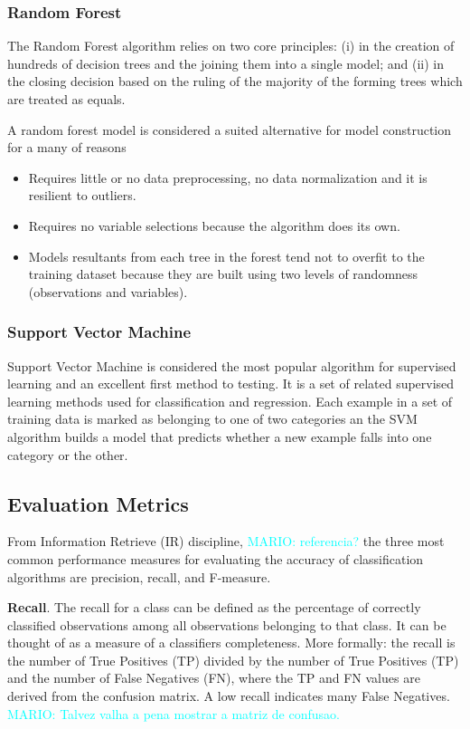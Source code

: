 \documentclass[10pt, conference]{IEEEtran}
\newcommand{\mario}[1]{\noindent\textcolor{cyan}{MARIO: {#1}}}
\newcommand{\mario}[1]{}
\begin{document}
\subsubsection{Random Forest}     \label{subsubsec:rf}
The Random Forest algorithm\cite{Breiman2001} relies on two core principles: (i) in the creation of hundreds of decision trees and the joining them into a single model; and (ii) in the closing decision based on the ruling of the majority of the forming trees which are treated as equals.

A random forest model is considered a suited alternative for model construction for a many of reasons\cite{Williams2011} 

\begin{itemize}
  \item Requires little or no data preprocessing, no data normalization and it is resilient to outliers.
  \item Requires no variable selections because the algorithm does its own.
  \item Models resultants from each tree in the forest tend not to overfit to the training dataset because they are built using two levels of randomness (observations and variables).
\end{itemize}

\subsubsection{Support Vector Machine}		\label{subsubsec:svm}
Support Vector Machine is considered the most popular algorithm for supervised learning and an excellent first method to testing\cite{Russell2010}. It is a set of related supervised learning methods used for classification and regression. Each example in a set of training data is marked as belonging to one of two categories an the SVM algorithm builds a model that predicts whether a new example falls into one category or the other. 

\subsection{Evaluation Metrics}	\label{subsec:metrics}
From Information Retrieve (IR) discipline, \mario{referencia?} the three most common performance measures for evaluating the accuracy of classification algorithms are precision, recall, and F-measure\cite{Feldman2007}. 

\textbf{Recall}. The recall for a class can be defined as the percentage of correctly classified observations among all observations belonging to that class. It can be thought of as a measure of a classifiers completeness. More formally\cite{Facelli2015}: the recall is the number of True Positives (TP) divided by the number of True Positives (TP) and the number of False Negatives (FN), where the TP and FN values are derived from the confusion matrix. A low recall indicates many False Negatives\cite{Zhao2013}. \mario{Talvez valha a pena mostrar a matriz de confusao.}
\end{document}
